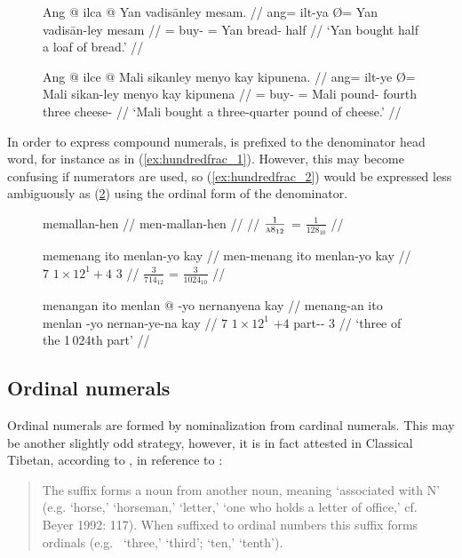 \begin{figure}[h]
\pex\label{ex:simplefrac}
\a\begingl
	\gla Ang @ ilca {} @ Yan vadisānley mesam. //
	\glb ang= ilt-ya Ø= Yan vadisān-ley mesam //
	\glc \AgtT{}= buy-\TsgM{} \Top{}= Yan bread-\PargI{} half //
	\glft `Yan bought half a loaf of bread.' //
\endgl

\a\begingl
	\gla Ang @ ilce {} @ Mali sikanley menyo kay kipunena. //
	\glb ang= ilt-ye Ø= Mali sikan-ley menyo kay kipunena //
	\glc \AgtT{}= buy-\TsgM{} \Top{}= Mali pound-\PargI{} fourth three
		cheese-\Gen{} //
	\glft `Mali bought a three-quarter pound of cheese.' //
\endgl
\xe
\end{figure}

In order to express compound numerals,  is prefixed to the
denominator head word, for instance as in (\ref{ex:hundredfrac_1}). However,
this may become confusing if numerators are used, so (\ref{ex:hundredfrac_2})
would be expressed less ambiguously as (\ref{ex:hundredfrac_3}) using the
ordinal form of the denominator.

\begin{figure}[h]
\pex
\a\label{ex:hundredfrac_1}\begingl
	\gla memallan-hen //
	\glb men-mallan-hen //
	 //
	\glft $\frac{1}{\textsc{a}8_{12}}$ = $\frac{1}{128_{10}}$ //
\endgl

\a\label{ex:hundredfrac_2}\ljudge\ques\begingl
	\gla memenang ito menlan-yo kay //
	\glb men-menang ito menlan-yo kay //
	 {$7$} {$1 \times 12^1 + 4$} {$3$} //
	\glft $\frac{3}{714_{12}}$ = $\frac{3}{1024_{10}}$ //
\endgl

\a\label{ex:hundredfrac_3}\begingl
	\gla menangan ito menlan @ -yo nernanyena kay //
	\glb menang-an ito menlan -yo nernan-ye-na kay //
	 {$7$} {$1 \times 12^1$} {$+4$} part-\Pl{}-\Gen{} 
		$3$ //
	\glft `three of the 1\,024th part' //
\endgl
\xe
\end{figure}

\subsection{Ordinal numerals}

Ordinal numerals are formed by nominalization from cardinal numerals. This may 
be another slightly odd strategy, however, it is in fact attested in Classical 
Tibetan, according to \citet{chungetal2014}, in reference to \citet{beyer1992}:

\blockcquote[626]{chungetal2014}{The suffix  forms a noun from another 
noun, meaning `associated with N' (e.g.  `horse,'  
`horseman,'  `letter,'  `one who holds a letter of 
office,' cf.\ \nocite{beyer1992} Beyer 1992: 117). When suffixed to ordinal 
numbers this suffix forms ordinals (e.g.\  `three,'  
`third';  `ten,'  `tenth').}

